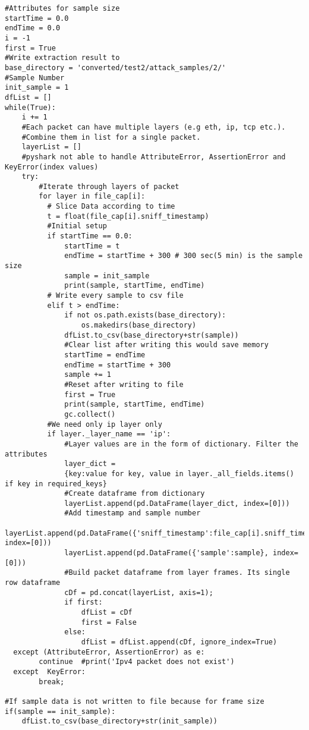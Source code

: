 \documentclass{report}
\begin{document}
\begin{verbatim}
#Attributes for sample size
startTime = 0.0
endTime = 0.0
i = -1
first = True
#Write extraction result to
base_directory = 'converted/test2/attack_samples/2/'
#Sample Number
init_sample = 1
dfList = []
while(True):
    i += 1
    #Each packet can have multiple layers (e.g eth, ip, tcp etc.).
    #Combine them in list for a single packet.
    layerList = []
    #pyshark not able to handle AttributeError, AssertionError and KeyError(index values)
    try:
        #Iterate through layers of packet
        for layer in file_cap[i]:
          # Slice Data according to time
          t = float(file_cap[i].sniff_timestamp)
          #Initial setup
          if startTime == 0.0:
              startTime = t
              endTime = startTime + 300 # 300 sec(5 min) is the sample size
              sample = init_sample
              print(sample, startTime, endTime)
          # Write every sample to csv file
          elif t > endTime:
              if not os.path.exists(base_directory):
                  os.makedirs(base_directory)
              dfList.to_csv(base_directory+str(sample))
              #Clear list after writing this would save memory
              startTime = endTime
              endTime = startTime + 300
              sample += 1
              #Reset after writing to file
              first = True
              print(sample, startTime, endTime)
              gc.collect()
          #We need only ip layer only
          if layer._layer_name == 'ip':
              #Layer values are in the form of dictionary. Filter the attributes
              layer_dict =
              {key:value for key, value in layer._all_fields.items() if key in required_keys}
              #Create dataframe from dictionary
              layerList.append(pd.DataFrame(layer_dict, index=[0]))
              #Add timestamp and sample number
              layerList.append(pd.DataFrame({'sniff_timestamp':file_cap[i].sniff_timestamp}, index=[0]))
              layerList.append(pd.DataFrame({'sample':sample}, index=[0]))
              #Build packet dataframe from layer frames. Its single row dataframe
              cDf = pd.concat(layerList, axis=1);
              if first:
                  dfList = cDf
                  first = False
              else:
                  dfList = dfList.append(cDf, ignore_index=True)
  except (AttributeError, AssertionError) as e:
        continue  #print('Ipv4 packet does not exist')
  except  KeyError:
        break;

#If sample data is not written to file because for frame size
if(sample == init_sample):
    dfList.to_csv(base_directory+str(init_sample))

\end{verbatim}
\pagebreak
\end{document}

